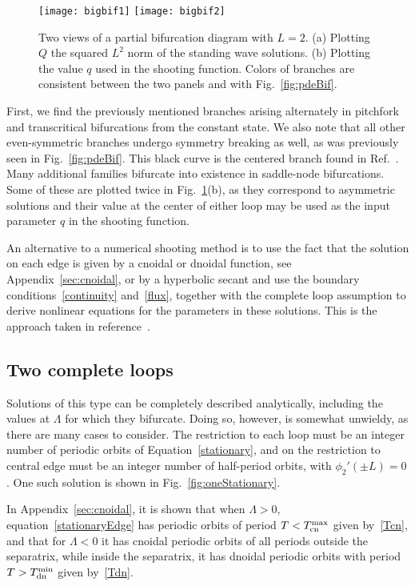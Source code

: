 \documentclass{article}
\numberwithin{equation}{section}
\numberwithin{figure}{section}
\begin{document}
\begin{figure}[htbp] %
   \centering
   \texttt{[image: bigbif1]} 
   \texttt{[image: bigbif2]} 
   \caption{Two views of a partial bifurcation diagram with $L=2$. (a) Plotting $Q$ the squared $L^2$ norm of the standing wave solutions. (b) Plotting the value $q$ used in the shooting function. Colors of branches are consistent between the two panels and with Fig.~\ref{fig:pdeBif}.}
\label{fig:bigbif}
\end{figure}

First, we find the previously mentioned branches arising alternately in pitchfork and transcritical bifurcations from the constant state. We also note that all other even-symmetric branches undergo symmetry breaking as well, as was previously seen in Fig.~\ref{fig:pdeBif}. This black curve is the centered branch found in Ref.~\cite{Marzuola:2016bl}.  Many additional families bifurcate into existence in saddle-node bifurcations. Some of these are plotted twice in Fig.~\ref{fig:bigbif}(b), as they correspond to asymmetric solutions and their value at the center of either loop may be used as the input parameter $q$ in the shooting function.

An alternative to a numerical shooting method is to use the fact that the solution on each edge is given by a cnoidal or dnoidal function, see Appendix~\ref{sec:cnoidal}, or by a hyperbolic secant and use the boundary conditions~\eqref{continuity} and~\eqref{flux}, together with the complete loop assumption to derive nonlinear equations for the parameters in these solutions. This is the approach taken in reference~\cite{Noja:2015hx}. 

\subsection{Two complete loops}

Solutions of this type can be completely described analytically, including the values at $\Lambda$ for which they bifurcate. Doing so, however, is somewhat unwieldy, as there are many cases to consider. The restriction to each loop must be an integer number of periodic orbits of Equation~\eqref{stationary}, and on the restriction to central edge must be an integer number of half-period orbits, with $\phi_2'(\pm L)=0$. One such solution is shown in Fig.~\ref{fig:oneStationary}.

In Appendix~\ref{sec:cnoidal}, it is shown that when $\Lambda>0$, equation~\eqref{stationaryEdge} has periodic orbits of period $T < T_{\rm cn}^{\rm max}$ given by~\eqref{Tcn}, and that for $\Lambda<0$ it has cnoidal periodic orbits of all periods outside the separatrix, while inside the separatrix, it has dnoidal periodic orbits with period $T > T_{\rm dn}^{\rm min}$ given by~\eqref{Tdn}.
\end{document}
